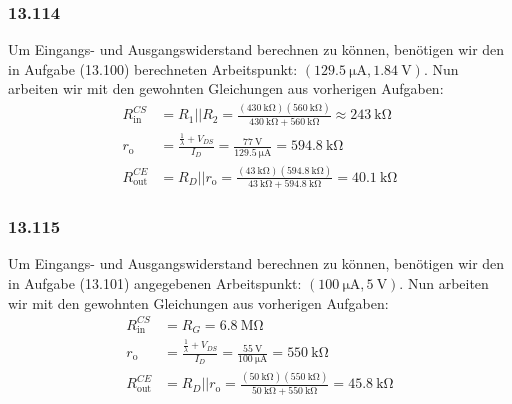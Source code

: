 \documentclass[11pt,a4paper,titlepage]{article}
\begin{document}
\subsubsection*{13.114}
Um Eingangs- und Ausgangswiderstand berechnen zu können, benötigen wir den in Aufgabe (13.100) berechneten Arbeitspunkt: $(\SI{129.5}{\micro\ampere},\SI{1.84}{\volt})$. Nun arbeiten wir mit den gewohnten Gleichungen aus vorherigen Aufgaben:
\begin{equation}
\begin{aligned}
R_{\text{in}}^{CS} &= R_1 || R_2 = \frac{(\SI{430}{\kilo\ohm})(\SI{560}{\kilo\ohm})}{\SI{430}{\kilo\ohm} + \SI{560}{\kilo\ohm}} \approx \SI{243}{\kilo\ohm} \\
r_{\text{o}} &= \frac{\frac{1}{\lambda}+V_{DS}}{I_D} = \frac{\SI{77}{\volt}}{\SI{129.5}{\micro\ampere}} = \SI{594.8}{\kilo\ohm} \\
R_{\text{out}}^{CE} &= R_D || r_{\text{o}} = \frac{(\SI{43}{\kilo\ohm})(\SI{594.8}{\kilo\ohm})}{\SI{43}{\kilo\ohm} + \SI{594.8}{\kilo\ohm}} = \SI{40.1}{\kilo\ohm}
\end{aligned}
\end{equation}

\subsubsection*{13.115}
Um Eingangs- und Ausgangswiderstand berechnen zu können, benötigen wir den in Aufgabe (13.101) angegebenen Arbeitspunkt: $(\SI{100}{\micro\ampere},\SI{5}{\volt})$. Nun arbeiten wir mit den gewohnten Gleichungen aus vorherigen Aufgaben:
\begin{equation}
\begin{aligned}
R_{\text{in}}^{CS} &= R_G = \SI{6.8}{\mega\ohm}\\
r_{\text{o}} &= \frac{\frac{1}{\lambda}+V_{DS}}{I_D} = \frac{\SI{55}{\volt}}{\SI{100}{\micro\ampere}} = \SI{550}{\kilo\ohm} \\
R_{\text{out}}^{CE} &= R_D || r_{\text{o}} = \frac{(\SI{50}{\kilo\ohm})(\SI{550}{\kilo\ohm})}{\SI{50}{\kilo\ohm} + \SI{550}{\kilo\ohm}} = \SI{45.8}{\kilo\ohm}
\end{aligned}
\end{equation}
\end{document}
